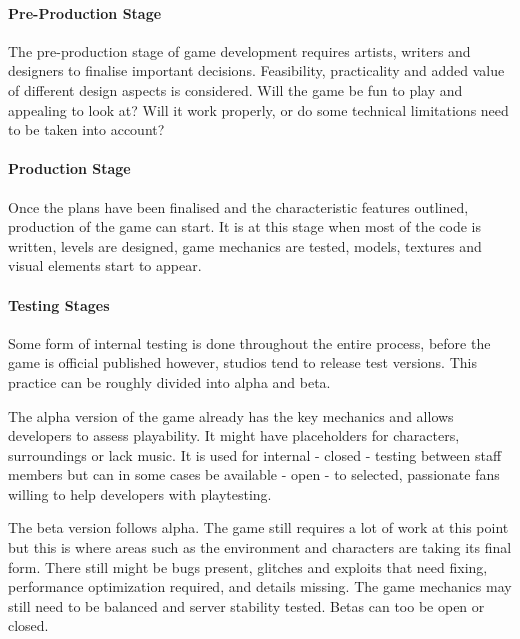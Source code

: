 \paragraph{Pre-Production Stage}
The pre-production stage of game development requires artists, writers and designers to finalise important decisions. Feasibility, practicality and added value of different design aspects is considered. Will the game be fun to play and appealing to look at? Will it work properly, or do some technical limitations need to be taken into account?

\paragraph{Production Stage}
Once the plans have been finalised and the characteristic features outlined, production of the game can start. It is at this stage when most of the code is written, levels are designed, game mechanics are tested, models, textures and visual elements start to appear.

\paragraph{Testing Stages}
Some form of internal testing is done throughout the entire process, before the game is official published however, studios tend to release test versions. This practice can be roughly divided into alpha and beta.

The alpha version of the game already has the key mechanics and allows developers to assess playability. It might have placeholders for characters, surroundings or lack music. It is used for internal - closed - testing between staff members but can in some cases be available - open - to selected, passionate fans willing to help developers with playtesting.

The beta version follows alpha. The game still requires a lot of work at this point but this is where areas such as the environment and characters are taking its final form. There still might be bugs present, glitches and exploits that need fixing, performance optimization required, and details missing. The game mechanics may still need to be balanced and server stability tested. Betas can too be open or closed.

